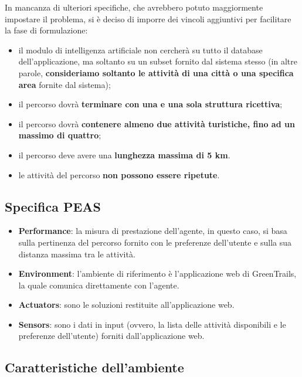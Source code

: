 \documentclass{CSUniSchoolLabReport}
\begin{document}
In mancanza di ulteriori specifiche, che avrebbero potuto maggiormente impostare il problema, si è deciso di imporre dei vincoli aggiuntivi per facilitare la fase di formulazione:
\begin{itemize}
	\item il modulo di intelligenza artificiale non cercherà su tutto il database dell'applicazione, ma soltanto su un subset fornito dal sistema stesso (in altre parole, \textbf{consideriamo soltanto le attività di una città o una specifica area} fornite dal sistema);
	\item il percorso dovrà \textbf{terminare con una e una sola struttura ricettiva};
	\item il percorso dovrà \textbf{contenere almeno due attività turistiche, fino ad un massimo di quattro};
	\item il percorso deve avere una \textbf{lunghezza massima di 5 km}.
    \item le attività del percorso \textbf{non possono essere ripetute}.
\end{itemize}

\pagebreak

\subsection{Specifica PEAS}

\begin{itemize}
 \item \textbf{Performance}: la misura di prestazione dell'agente, in questo caso, si basa sulla pertinenza del percorso fornito con le preferenze dell'utente e sulla sua distanza massima tra le attività.
 \item \textbf{Environment}: l'ambiente di riferimento è l'applicazione web di GreenTrails, la quale comunica direttamente con l'agente.
 \item \textbf{Actuators}: sono le soluzioni restituite all'applicazione web.
 \item \textbf{Sensors}: sono i dati in input (ovvero, la lista delle attività disponibili e le preferenze dell'utente) forniti dall'applicazione web.
\end{itemize}


\subsection{Caratteristiche dell'ambiente}
\end{document}
